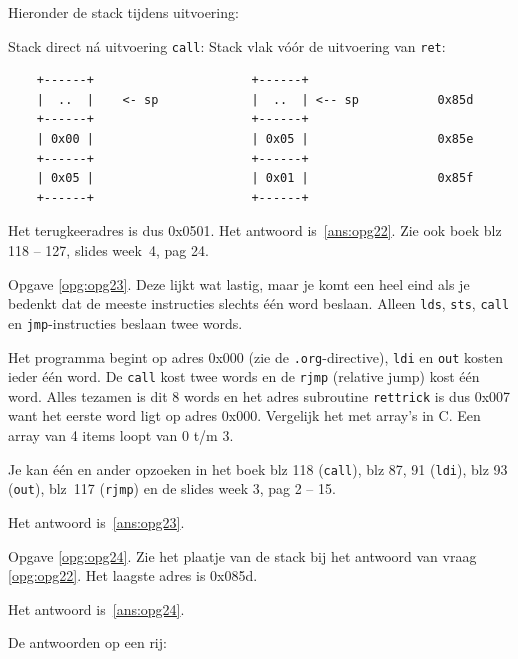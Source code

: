 \documentclass[a4paper,12pt,fleqn,dutch,mimicwordtwentyten]{tisdexam}
\begin{document}
\begin{questions}
\newpage
Hieronder de stack tijdens uitvoering:

Stack direct n\'{a} uitvoering \texttt{call}: \hspace{20pt} Stack vlak
v\'{o}\'{o}r de uitvoering van \texttt{ret}:

\begin{lstlisting}
    +------+                      +------+
    |  ..  |    <- sp             |  ..  | <-- sp           0x85d
    +------+                      +------+
    | 0x00 |                      | 0x05 |                  0x85e
    +------+                      +------+
    | 0x05 |                      | 0x01 |                  0x85f
    +------+                      +------+
\end{lstlisting}

Het terugkeeradres is dus 0x0501. Het antwoord is~\ref{ans:opg22}.
Zie ook boek blz 118 -- 127, slides week~4, pag 24.

\vspace{1em}
Opgave \ref{opg:opg23}.\label{sol:opg23}
Deze lijkt wat lastig, maar je komt een heel eind als je bedenkt dat de meeste
instructies slechts \'{e}\'{e}n word beslaan. Alleen \texttt{lds},
\texttt{sts}, \texttt{call} en \texttt{jmp}-instructies beslaan twee words.

Het programma begint op adres 0x000 (zie de \texttt{.org}-directive),
\texttt{ldi} en \texttt{out} kosten ieder \'{e}\'{e}n word. De \texttt{call}
kost twee words en de \texttt{rjmp} (relative jump) kost \'{e}\'{e}n word.
Alles tezamen is dit 8 words en het adres subroutine \texttt{rettrick} is dus
0x007 want het eerste word ligt op adres 0x000. Vergelijk het met array's in
C. Een array van 4 items loopt van 0 t/m 3.

Je kan \'{e}\'{e}n en ander opzoeken in het boek blz 118 (\texttt{call}), blz
87, 91 (\texttt{ldi}), blz 93 (\texttt{out}), blz~117 (\texttt{rjmp}) en
de slides week 3, pag 2 -- 15.

Het antwoord is~\ref{ans:opg23}.

\vspace{1em}
Opgave \ref{opg:opg24}.\label{sol:opg24}
Zie het plaatje van de stack bij het antwoord van vraag \ref{opg:opg22}.
Het laagste adres is 0x085d.

Het antwoord is~\ref{ans:opg24}.


\bigskip\bigskip
De antwoorden op een rij:
\medskip


\end{questions}
\end{document}
